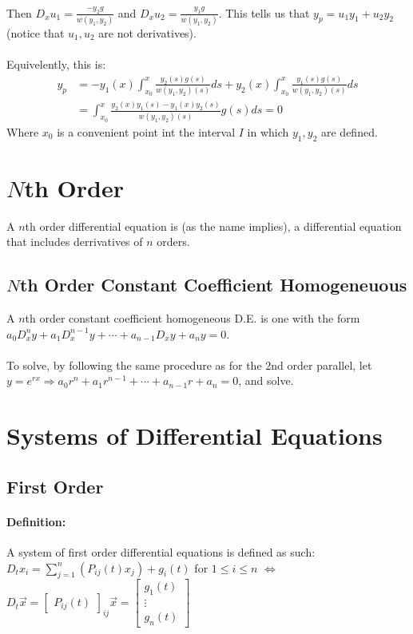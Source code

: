 \documentclass{article}
\begin{document}
\paragraph{}
Then $D_x u_1 = \frac{-y_2 g}{w(y_1, y_2)}$ and $D_x u_2 = \frac{y_1 g}{w(y_1, y_2)}$.  This tells us that $y_p = u_1 y_1 + u_2 y_2$ (notice that $u_1, u_2$ are not derivatives).

\paragraph{}
Equivelently, this is:
\[
\begin{aligned}
	y_p & = -y_1(x) \int_{x_0}^x \frac{y_2 (s) g(s)}{w(y_1, y_2)(s)} ds + y_2(x) \int_{x_0}^x \frac{y_1 (s) g(s)}{w(y_1, y_2)(s)} ds \\
	    & = \int_{x_0}^x \frac{y_2(x)y_1(s)-y_1(x)y_2(s)}{w(y_1,y_2)(s)} g(s) ds = 0
\end{aligned}
\]
Where $x_0$ is a convenient point int the interval $I$ in which $y_1, y_2$ are defined.

\section{$N$th Order}
A $n$th order differential equation is (as the name implies), a differential equation that includes derrivatives of $n$ orders.
\subsection{$N$th Order Constant Coefficient Homogeneuous}
A $n$th order constant coefficient homogeneous D.E. is one with the form $a_0 D_x^n y + a_1 D_x^{n-1} y + \cdots + a_{n-1} D_x y + a_n y=0$.

\paragraph{}
To solve, by following the same procedure as for the 2nd order parallel, let $y=e^{rx} \Rightarrow a_0r^n + a_1r^{n-1} + \cdots + a_{n-1}r + a_n = 0$, and solve.

\section{Systems of Differential Equations}
\subsection{First Order}
\paragraph{Definition:}
A system of first order differential equations is defined as such: $D_t x_i = \sum\limits_{j=1}^n (P_{ij} (t) x_j) + g_i (t)$ for $1 \le i \le n$ $\Leftrightarrow$ $D_t \vec{x} = \begin{bmatrix} P_{ij} (t) \end{bmatrix}_{ij} \vec{x} = \begin{bmatrix} g_1(t) \\ \vdots \\ g_n(t) \end{bmatrix} $
\end{document}
